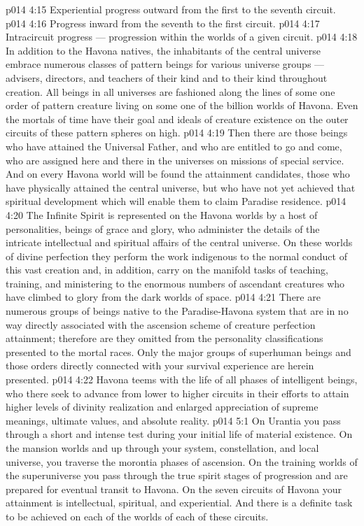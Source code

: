 \vs p014 4:15 \bibnobreakspace Experiential progress outward from the first to the seventh circuit.
\vs p014 4:16 \bibnobreakspace Progress inward from the seventh to the first circuit.
\vs p014 4:17 \bibnobreakspace Intracircuit progress --- progression within the worlds of a given circuit.
\vs p014 4:18 \pc In addition to the Havona natives, the inhabitants of the central universe embrace numerous classes of pattern beings for various universe groups --- advisers, directors, and teachers of their kind and to their kind throughout creation. All beings in all universes are fashioned along the lines of some one order of pattern creature living on some one of the billion worlds of Havona. Even the mortals of time have their goal and ideals of creature existence on the outer circuits of these pattern spheres on high.
\vs p014 4:19 Then there are those beings who have attained the Universal Father, and who are entitled to go and come, who are assigned here and there in the universes on missions of special service. And on every Havona world will be found the attainment candidates, those who have physically attained the central universe, but who have not yet achieved that spiritual development which will enable them to claim Paradise residence.
\vs p014 4:20 The Infinite Spirit is represented on the Havona worlds by a host of personalities, beings of grace and glory, who administer the details of the intricate intellectual and spiritual affairs of the central universe. On these worlds of divine perfection they perform the work indigenous to the normal conduct of this vast creation and, in addition, carry on the manifold tasks of teaching, training, and ministering to the enormous numbers of ascendant creatures who have climbed to glory from the dark worlds of space.
\vs p014 4:21 There are numerous groups of beings native to the Paradise\hyp{}Havona system that are in no way directly associated with the ascension scheme of creature perfection attainment; therefore are they omitted from the personality classifications presented to the mortal races. Only the major groups of superhuman beings and those orders directly connected with your survival experience are herein presented.
\vs p014 4:22 Havona teems with the life of all phases of intelligent beings, who there seek to advance from lower to higher circuits in their efforts to attain higher levels of divinity realization and enlarged appreciation of supreme meanings, ultimate values, and absolute reality.
\vs p014 5:1 On Urantia you pass through a short and intense test during your initial life of material existence. On the mansion worlds and up through your system, constellation, and local universe, you traverse the morontia phases of ascension. On the training worlds of the superuniverse you pass through the true spirit stages of progression and are prepared for eventual transit to Havona. On the seven circuits of Havona your attainment is intellectual, spiritual, and experiential. And there is a definite task to be achieved on each of the worlds of each of these circuits.
